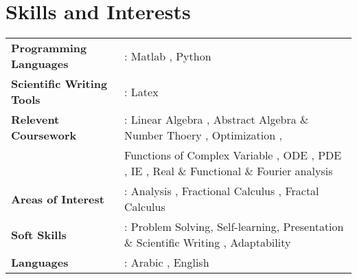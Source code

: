 \documentclass[a4paper,11pt]{article}
\makeatletter
\newcommand{\resumePOR}[3]{
\vspace{0.5mm}\item
    \begin{tabular*}{0.97\textwidth}[t]{l@{\extracolsep{\fill}}r}
        \textbf{#1}\hspace{0.3mm}#2 & \textit{\small{#3}} 
    \end{tabular*}
    \vspace{-2mm}
}
\newcommand{\resumeSubHeadingListStart}{\begin{itemize}[leftmargin=*,labelsep=0mm]}
\newcommand{\resumeItemListStart}{\begin{justify}\begin{itemize}[leftmargin=3ex, rightmargin=2ex, noitemsep,labelsep=1.2mm,itemsep=0mm]\small}
\newcommand{\resumeSubHeadingListEnd}{\end{itemize}\vspace{2mm}}
\newcommand{\resumeItemListEnd}{\end{itemize}\end{justify}\vspace{-2mm}}
\makeatother
\begin{document}
\section{\textbf{Skills and Interests}}
 \begin{itemize}[leftmargin=0.05in, label={}]
    \small{\item{
      \begin{tabular}[h]{l l}
        \textbf{Programming Languages}\hspace*{.15cm} &  : Matlab , Python \\
        \textbf{Scientific Writing Tools} & : Latex \\
        \textbf{Relevent Coursework} & : Linear Algebra , Abstract Algebra \& Number Thoery , Optimization , \\ 
        & \hspace*{.15cm} Functions of Complex Variable , ODE , PDE , IE , Real \& Functional \& Fourier analysis \\
        \textbf{Areas of Interest} & : Analysis , Fractional Calculus , Fractal Calculus\\
        \textbf{Soft Skills} & : Problem Solving, Self-learning, Presentation \& Scientific Writing , Adaptability \\
        \textbf{Languages} & : Arabic , English   
      \end{tabular}
    }}
 \end{itemize}
 \vspace{-16pt}




\end{document}

